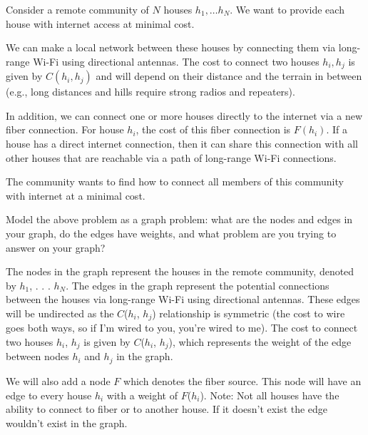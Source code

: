 


\maketitle
\DEFAULTMSG{}

\begin{problem}
Consider a remote community of $N$ houses $h_1, \dots h_N$. We want to provide each house with internet access at minimal cost.

We can make a local network between these houses by connecting them via long-range Wi-Fi using directional antennas. The cost to connect two houses $h_i, h_j$ is given by $C(h_i, h_j)$ and will depend on their distance and the terrain in between (e.g., long distances and hills require strong radios and repeaters).

In addition, we can connect one or more houses directly to the internet via a new fiber connection.  For house $h_i$, the cost of this fiber connection is $F(h_i)$. If a house has a direct internet connection, then it can share this connection with all other houses that are reachable via a path of long-range Wi-Fi connections.

The community wants to find how to connect all members of this community with internet at a minimal cost.
\begin{questions}
\item Model the above problem as a graph problem: what are the nodes and edges in your graph, do the edges have weights, and what problem are you trying to answer on your graph?

The nodes in the graph represent the houses in the remote community, denoted by $h_1$, . . . $h_N$. The edges in the graph represent the potential connections between the houses via long-range Wi-Fi using directional antennas. These edges will be undirected as the $C$($h_i$, $h_j$) relationship is symmetric (the cost to wire goes both ways, so if I'm wired to you, you're wired to me). The cost to connect two houses $h_i$, $h_j$ is given by $C$($h_i$, $h_j$), which represents the weight of the edge between nodes $h_i$ and $h_j$ in the graph.

We will also add a node $F$ which denotes the fiber source. This node will have an edge to every house $h_i$ with a weight of $F$($h_i$). Note: Not all houses have the ability to connect to fiber or to another house. If it doesn't exist the edge wouldn't exist in the graph.


\end{questions}
\end{problem}
